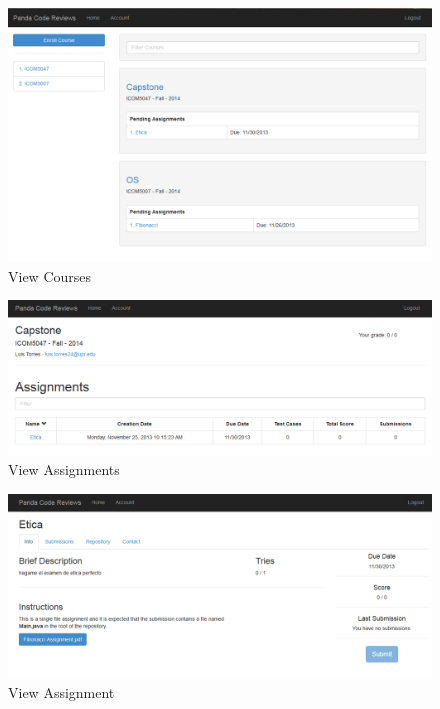 \begin{figure}[H]
	\centering
	\includegraphics[width=\textwidth]{img/courses-screen}
	\caption{View Courses}
\end{figure}

\begin{figure}[H]
	\centering
	\includegraphics[width=\textwidth]{img/assignments-screen}
	\caption{View Assignments}
\end{figure}

\begin{figure}[H]
	\centering
	\includegraphics[width=\textwidth]{img/assignment-scren}
	\caption{View Assignment}
\end{figure}

